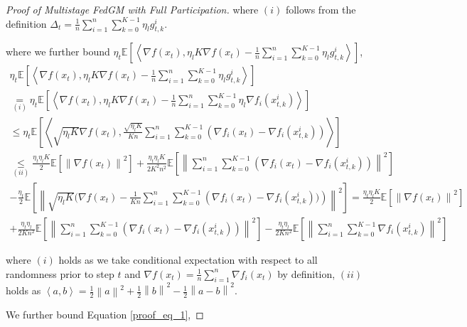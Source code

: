 \begin{proof}[Proof of Multistage FedGM with Full Participation]
where $(i)$ follows from the definition $\Delta_t=\frac{1}{n}\sum_{i=1}^n\sum_{k=0}^{K-1}\eta_l g_{t,k}^i$.

where we further bound $\eta_t\mathbb{E}\left[\left\langle \nabla f(x_t), \eta_l K \nabla f(x_t) - \frac{1}{n}\sum_{i=1}^n\sum_{k=0}^{K-1}\eta_l g_{t,k}^i \right\rangle\right]$,
\begin{equation}
\begin{gathered}
\eta_t\mathbb{E}\left[\left\langle \nabla f(x_t), \eta_l K \nabla f(x_t) - \frac{1}{n}\sum_{i=1}^n\sum_{k=0}^{K-1}\eta_l g_{t,k}^i \right\rangle\right]\\
\underset{(i)}{=}\eta_t\mathbb{E}\left[\left\langle \nabla f(x_t), \eta_l K \nabla f(x_t) - \frac{1}{n}\sum_{i=1}^n\sum_{k=0}^{K-1}\eta_l \nabla f_i(x_{t,k}^i) \right\rangle\right]\\
\leq \eta_t \mathbb{E}\left[ \left\langle \sqrt{\eta_l K} \nabla f(x_t), \frac{\sqrt{\eta_l K}}{K n} \sum_{i=1}^n\sum_{k=0}^{K-1} \left( \nabla f_i(x_t)-\nabla f_i(x_{t,k}^i) \right) \right\rangle \right]\\
\underset{(ii)}{\leq} \frac{\eta_t \eta_l K}{2} \mathbb{E}\left[ \left\| \nabla f(x_t) \right\|^2\right] + \frac{\eta_t \eta_l K}{2K^2 n^2} \mathbb{E}\left[\left\| \sum_{i=1}^n\sum_{k=0}^{K-1} \left(\nabla f_i(x_t) - \nabla f_i(x_{t,k}^i) \right)\right\|^2\right]\\
-\frac{\eta_t}{2}\mathbb{E}\left[\left\|\sqrt{\eta_l K}(\nabla f(x_t)-\frac{1}{Kn}\sum_{i=1}^n\sum_{k=0}^{K-1} \left(\nabla f_i(x_t)-\nabla f_i(x_{t,k}^i))\right)\right\|^2\right] = \frac{\eta_t \eta_l K}{2}\mathbb{E}\left[\left\|\nabla f(x_t)\right\|^2\right] \\
+ \frac{\eta_t\eta_l}{2Kn^2}\mathbb{E}\left[\left\|\sum_{i=1}^n\sum_{k=0}^{K-1} \left( \nabla f_i(x_t)-\nabla f_i(x_{t,k}^i) \right)\right\|^2\right]-\frac{\eta_t\eta_l}{2Kn^2}\mathbb{E}\left[\left\| \sum_{i=1}^n\sum_{k=0}^{K-1}\nabla f_i(x_{t,k}^i)\right\|^2\right]
\end{gathered}
\label{proof_eq_1}
\end{equation}

where $(i)$ holds as we take conditional expectation with respect to all randomness prior to step $t$ and $\nabla f(x_t)=\frac{1}{n}\sum_{i=1}^n \nabla f_i(x_t)$ by definition, $(ii)$ holds as $\left\langle a, b \right\rangle = \frac{1}{2} \left\| a \right\|^2 + \frac{1}{2} \left\| b \right\|^2 - \frac{1}{2} \left\| a - b \right\|^2 $.

We further bound Equation \ref{proof_eq_1},


\end{proof}

